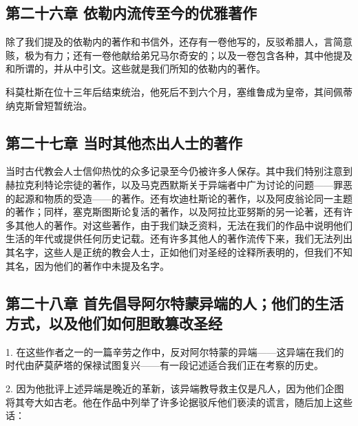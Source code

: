 
\subsection{第二十六章  依勒内流传至今的优雅著作}

除了我们提及的依勒内的著作和书信外，还存有一卷他写的，反驳希腊人，言简意赅，极为有力；还有一卷他献给弟兄马尔奇安的；以及一卷包含各种，其中他提及和所谓的，并从中引文。这些就是我们所知的依勒内的著作。\par

科莫杜斯在位十三年后结束统治，他死后不到六个月，塞维鲁成为皇帝，其间佩蒂纳克斯曾短暂统治。\par


\subsection{第二十七章  当时其他杰出人士的著作}

当时古代教会人士信仰热忱的众多记录至今仍被许多人保存。其中我们特别注意到赫拉克利特论宗徒的著作，以及马克西默斯关于异端者中广为讨论的问题——罪恶的起源和物质的受造——的著作。还有坎迪杜斯论的著作，以及阿皮翁论同一主题的著作；同样，塞克斯图斯论复活的著作，以及阿拉比亚努斯的另一论著，还有许多其他人的著作。对这些著作，由于我们缺乏资料，无法在我们的作品中说明他们生活的年代或提供任何历史记载。还有许多其他人的著作流传下来，我们无法列出其名字，这些人是正统的教会人士，正如他们对圣经的诠释所表明的，但我们不知其名，因为他们的著作中未提及名字。\par


\subsection{第二十八章  首先倡导阿尔特蒙异端的人；他们的生活方式，以及他们如何胆敢篡改圣经}

1. 在这些作者之一的一篇辛劳之作中，反对阿尔特蒙的异端——这异端在我们的时代由萨莫萨塔的保禄试图复兴——有一段记述适合我们正在考察的历史。\par

2. 因为他批评上述异端是晚近的革新，该异端教导救主仅是凡人，因为他们企图将其夸大如古老。他在作品中列举了许多论据驳斥他们亵渎的谎言，随后加上这些话：\par

